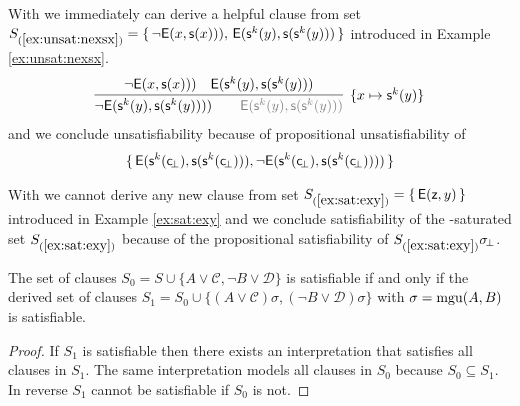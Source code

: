 \begin{example}
	With \InstGen we immediately can derive a helpful clause from set
\(
	S_{(\ref{ex:unsat:nexsx})} =
\{\,
{ \lnot\mathsf{E}(x, \mathsf{s}(x)))},\,
{ \mathsf{E}(\mathsf{s}^k(y), \mathsf{s}(\mathsf{s}^k(y)))}
\,\}
\)
 introduced in Example \ref{ex:unsat:nexsx}.
\begin{gather*}
\infer[\{x\mapsto\msucc^k(y)\}]{
	{ \lnot\mE(\msucc^k(y), \msucc(\msucc^k(y))))} \qquad
	{\colG \mE(\msucc^k(y), \msucc(\msucc^k(y)))}
}{
	{ \lnot\mE(x, \msucc(x)))} &
	{ \mE(\msucc^k(y), \msucc(\msucc^k(y)))}
}
\end{gather*}
and we conclude unsatisfiability because of propositional unsatisfiability of
\begin{gather*}
\{\,
	\mathsf{E}(\mathsf{s}^k(\mathsf{c}\!_\bot), \mathsf{s}(\mathsf{s}^k(\mathsf{c}\!_\bot))), \lnot\mathsf{E}(\mathsf{s}^k(\mathsf{c}\!_\bot), \mathsf{s}(\mathsf{s}^k(\mathsf{c}\!_\bot))))
\,\}
\end{gather*}

\end{example}

\begin{example}
	With \InstGen we cannot derive any new clause from set
	\(S_{(\ref{ex:sat:exy})  } = \{\,\mathsf{E}(\mathsf{z},y)\,\}\)
	introduced in Example \ref{ex:sat:exy} and we conclude satisfiability
	of the \InstGen-saturated set \(S_{(\ref{ex:sat:exy})  }\)
	because of the propositional satisfiability of \(S_{(\ref{ex:sat:exy})  }\sigma\!_\bot\).
\end{example}

\begin{lemma}
	The set of clauses
	\(
		S_0 = S \cup
	\{
		 A\lor\mathcal C, \lnot B\lor\mathcal D
	\}
	\)
	is satisfiable if and only if
	the derived set of clauses
	\(S_1 = S_0 \cup \{ (A\lor\mathcal C)\sigma, (\lnot B\lor\mathcal D)\sigma\}\)
	with \(\sigma = \operatorname{mgu}(A,B)\) is satisfiable.
\end{lemma}

\begin{proof}
	If \(S_1\) is satisfiable then there exists an interpretation that satisfies all clauses in \(S_1\).
	The same interpretation models all clauses in \(S_0\) because \(S_0\subseteq S_1\).
	In reverse \(S_1\) cannot be satisfiable if \(S_0\) is not.


\end{proof}

